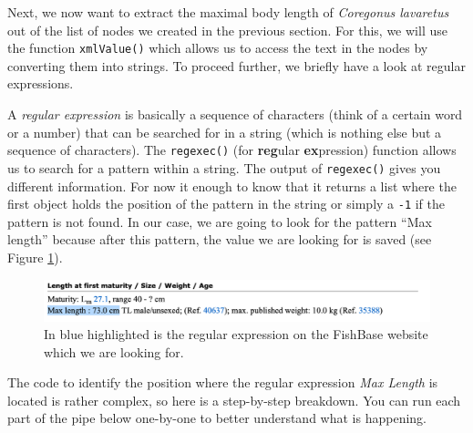 \documentclass[
]{book}
\newenvironment{Shaded}{\begin{snugshade}}{\end{snugshade}}
\newcommand{\CommentTok}[1]{\textcolor[rgb]{0.56,0.35,0.01}{\textit{#1}}}
\newcommand{\DataTypeTok}[1]{\textcolor[rgb]{0.13,0.29,0.53}{#1}}
\newcommand{\KeywordTok}[1]{\textcolor[rgb]{0.13,0.29,0.53}{\textbf{#1}}}
\newcommand{\NormalTok}[1]{#1}
\newcommand{\OperatorTok}[1]{\textcolor[rgb]{0.81,0.36,0.00}{\textbf{#1}}}
\newcommand{\StringTok}[1]{\textcolor[rgb]{0.31,0.60,0.02}{#1}}
\begin{document}
Next, we now want to extract the maximal body length of \emph{Coregonus lavaretus} out of the list of nodes we created in the previous section. For this, we will use the function \texttt{xmlValue()} which allows us to access the text in the nodes by converting them into strings. To proceed further, we briefly have a look at regular expressions.

A \emph{regular expression} is basically a sequence of characters (think of a certain word or a number) that can be searched for in a string (which is nothing else but a sequence of characters). The \texttt{regexec()} (for \textbf{reg}ular \textbf{ex}pression) function allows us to search for a pattern within a string. The output of \texttt{regexec()} gives you different information. For now it enough to know that it returns a list where the first object holds the position of the pattern in the string or simply a \texttt{-1} if the pattern is not found. In our case, we are going to look for the pattern ``Max length'' because after this pattern, the value we are looking for is saved (see Figure \ref{fig:length}).

\begin{figure}
\includegraphics[width=21.72in]{./figures/length} \caption{In blue highlighted is the regular expression on the FishBase website which we are looking for.}\label{fig:length}
\end{figure}

The code to identify the position where the regular expression \emph{Max Length} is located is rather complex, so here is a step-by-step breakdown. You can run each part of the pipe below one-by-one to better understand what is happening.

\begin{Shaded}
\end{Shaded}
\end{document}
